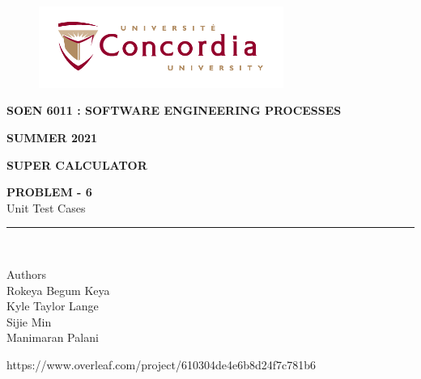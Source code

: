 \documentclass[a4paper, 11pt]{report}
\begin{document}
\begin{titlepage}
\vspace*{0.7in}
\begin{center}
\begin{figure}[htb]
\begin{center}
\includegraphics[width=8cm]{univ_logo}
\end{center}
\end{figure}
\vspace*{0.3in}
\begin{Large}
\textbf{SOEN 6011 : SOFTWARE ENGINEERING PROCESSES} \\
\end{Large}
\vspace*{0.1in}
\begin{Large}
\textbf{SUMMER 2021} \\
\end{Large}
\vspace*{0.9in}
\begin{Large}
\textbf{SUPER CALCULATOR} \\
\end{Large}
\vspace*{0.9in}
\begin{Large} 


\textbf{PROBLEM - 6} \\
Unit Test Cases\\
\end{Large}
\vspace*{0.9in}
\rule{80mm}{0.1mm}\\
\vspace*{0.1in}
\begin{large}
Authors \\
\vspace*{0.1in}
Rokeya Begum Keya\\
\vspace*{0.1in}
Kyle Taylor Lange\\
\vspace*{0.1in}
Sijie Min\\
\vspace*{0.1in}
Manimaran Palani\\ 
\vspace*{0.3in}
\date{\normalsize\today} 
\end{large}
\end{center}
\begin{center}
https://www.overleaf.com/project/610304de4e6b8d24f7c781b6\end{center}
\end{titlepage}
\tableofcontents
\newpage
{}
\newpage
\pagebreak
\end{document}
